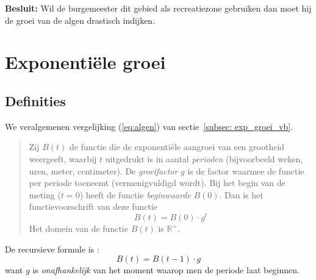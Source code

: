  \noindent
\textbf {Besluit:} Wil de burgemeester dit gebied als recreatiezone gebruiken
 dan moet hij de groei van de algen drastisch indijken.



\newpage
\section{Exponenti\"{e}le groei}
\subsection{Definities}

We veralgemenen vergelijking (\ref{eq:algen}) van sectie~\ref{subsec: exp_groei_vb}. 
\begin{quote}

Zij  $B(t)$ de functie die de exponenti\"{e}le
aangroei van een grootheid weergeeft, waarbij $t$ uitgedrukt is in aantal \emph{perioden} (bijvoorbeeld weken, uren, meter, centimeter). De \emph{groeifactor} $g$ is de factor waarmee de functie per periode toeneemt (vermenigvuldigd wordt). Bij het begin van de meting ($t=0$) heeft de functie \emph{beginwaarde} $B(0)$. Dan is het functievoorschrift van deze functie
\begin{equation}
    B(t)=B(0)\cdot g^{t}
    \label{eq:eq_groei2}
\end{equation}
Het domein van de functie $B(t)$ is $\mathbb{R}^+$.

\end{quote}
De recursieve formule is :
\begin{equation}
    B(t)=B(t-1)\cdot g
\end{equation}
want $g$ is \emph{onafhankelijk} van het moment waarop men de periode laat
beginnen.



